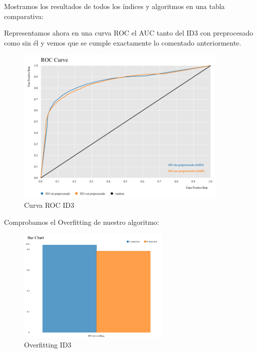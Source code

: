 	Mostramos los resultados de todos los índices y algoritmos en una tabla comparativa:

	\begin{table}[h]
	\end{table}


	Representamos ahora en una curva ROC el AUC tanto del ID3 con preprocesado como sin él y vemos que se cumple exactamente lo comentado anteriormente.

	\begin{figure}[H]
		\centering
		\includegraphics[width=0.9\textwidth]{img/id3roc.png}
		\caption{Curva ROC ID3}
	\end{figure}


	\newpage

	Comprobamos el Overfitting de nuestro algoritmo:
	
	\begin{figure}[H]
		\centering
		\includegraphics[width=0.65\textwidth]{img/sobreid3.png}
		\caption{Overfitting ID3}
	\end{figure}

